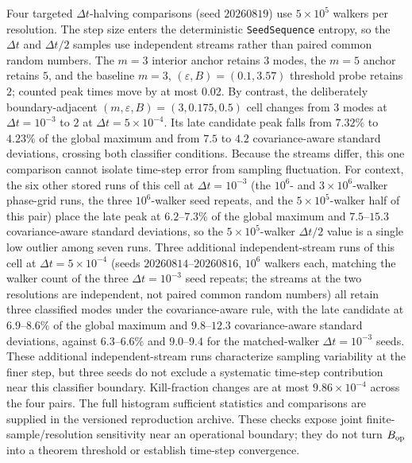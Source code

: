 \documentclass[aps,physrev,onecolumn,amsmath,amssymb,longbibliography]{revtex4-2}
\begin{document}
Four targeted \(\Delta t\)-halving comparisons (seed \(20260819\)) use
\(5\times10^5\) walkers
per resolution.  The step size enters the deterministic
\texttt{SeedSequence} entropy, so the \(\Delta t\) and \(\Delta t/2\) samples
use independent streams rather than paired common random numbers.  The
\(m=3\) interior anchor retains \(3\) modes, the
\(m=5\) anchor retains \(5\), and the baseline \(m=3\),
\((\varepsilon,B)=(0.1,3.57)\) threshold probe retains \(2\); counted peak
times move by at most 0.02.  By contrast, the deliberately boundary-adjacent
\((m,\varepsilon,B)=(3,0.175,0.5)\) cell changes from \(3\) modes at
\(\Delta t=10^{-3}\) to \(2\) at \(\Delta t=5\times10^{-4}\).  Its late
candidate peak falls from \(7.32\%\) to \(4.23\%\) of the global maximum
and from \(7.5\) to \(4.2\) covariance-aware standard deviations, crossing
both classifier conditions.  Because the streams differ, this one
comparison cannot isolate time-step error from sampling fluctuation.
For context, the six other stored runs of this cell at
\(\Delta t=10^{-3}\) (the \(10^{6}\)- and \(3\times10^{6}\)-walker
phase-grid runs, the three \(10^{6}\)-walker seed repeats, and the
\(5\times10^{5}\)-walker half of this pair) place the late peak at
\(6.2\)--\(7.3\%\) of the global maximum and \(7.5\)--\(15.3\)
covariance-aware standard deviations, so the \(5\times10^{5}\)-walker
\(\Delta t/2\) value is a single low outlier among seven runs.  Three
additional independent-stream runs of this cell at
\(\Delta t=5\times10^{-4}\) (seeds \(20260814\)--\(20260816\),
\(10^{6}\) walkers each, matching the walker count of the three
\(\Delta t=10^{-3}\) seed repeats; the streams at the two resolutions are
independent, not paired common random numbers) all retain three classified
modes under the covariance-aware rule, with the late candidate at
\(6.9\)--\(8.6\%\) of the global maximum and \(9.8\)--\(12.3\)
covariance-aware standard deviations, against \(6.3\)--\(6.6\%\) and
\(9.0\)--\(9.4\) for the matched-walker \(\Delta t=10^{-3}\) seeds.
These additional independent-stream runs characterize sampling variability
at the finer step, but three seeds do not exclude a systematic time-step
contribution near this classifier boundary.
Kill-fraction changes are at most
\(9.86\times10^{-4}\) across the four pairs.  The full histogram sufficient
statistics and comparisons are supplied in the versioned reproduction
archive.  These checks expose joint finite-sample/resolution sensitivity near
an operational boundary; they do not turn \(B_{\rm op}\) into a theorem
threshold or establish time-step convergence.
\end{document}
